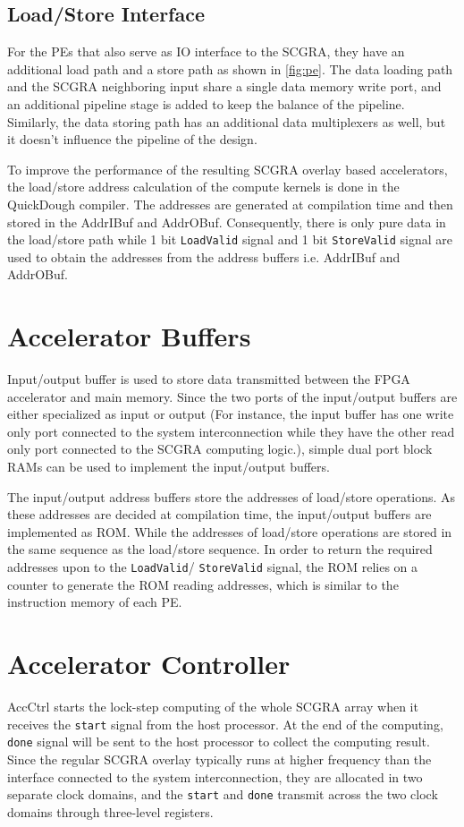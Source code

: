 \subsection{Load/Store Interface}
For the PEs that also serve as IO interface to the SCGRA, they have an additional load path and a store path as shown in \ref{fig:pe}. The data loading path and the SCGRA neighboring input share a single data memory write port, and an additional pipeline stage is added to keep the balance of the pipeline. Similarly, the data storing path has an additional data multiplexers as well, but it doesn't influence the pipeline of the design. 

To improve the performance of the resulting SCGRA overlay based accelerators, the load/store address calculation of the compute kernels is done in the QuickDough compiler. The addresses are generated at compilation time and then stored in the AddrIBuf and AddrOBuf. Consequently, there is only pure data in the load/store path while 1 bit \texttt{LoadValid} signal and 1 bit \texttt{StoreValid} signal are used to obtain the addresses from the address buffers i.e. AddrIBuf and AddrOBuf.

\section{Accelerator Buffers}
Input/output buffer is used to store data transmitted between the FPGA accelerator and main memory. Since the two ports of the input/output buffers are either specialized as input or output (For instance, the input buffer has one write only port connected to the system interconnection while they have the other read only port connected to the SCGRA computing logic.), simple dual port block RAMs can be used to implement the input/output buffers. 

The input/output address buffers store the addresses of load/store operations. As these addresses are decided at compilation time, the input/output buffers are implemented as ROM. While the addresses of load/store operations are stored in the same sequence as the load/store sequence. In order to return the required addresses upon to the \texttt{LoadValid}/ \texttt{StoreValid} signal, the ROM relies on a counter to generate the ROM reading addresses, which is similar to the instruction memory of each PE. 

\section{Accelerator Controller}
AccCtrl starts the lock-step computing of the whole SCGRA array when it receives the \texttt{start} signal from the host processor. At the end of the computing, \texttt{done} signal will be sent to the host processor to collect the computing result. Since the regular SCGRA overlay typically runs at higher frequency than the interface connected to the system interconnection, they are allocated in two separate clock domains, and the \texttt{start} and \texttt{done} transmit across the two clock domains through three-level registers.

